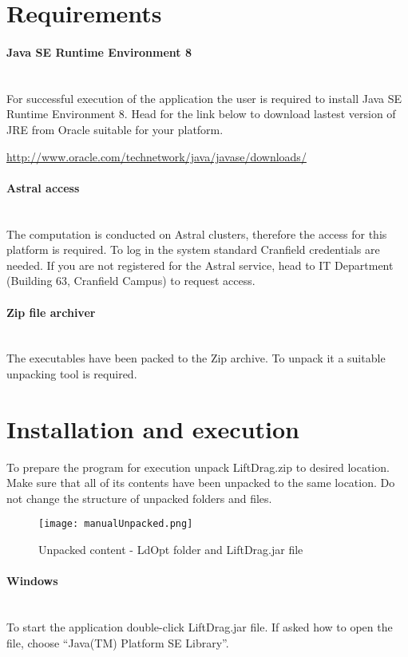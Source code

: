 \documentclass[a4paper,12pt]{article}
\begin{document}
\section{Requirements}
\paragraph{Java SE Runtime Environment 8}\mbox{}\\
For successful execution of the application the user is required to install Java SE Runtime Environment 8. Head for the link below to download lastest version of JRE from Oracle suitable for your platform.
\newline

\url{http://www.oracle.com/technetwork/java/javase/downloads/}

\paragraph{Astral access}\mbox{}\\
The computation is conducted on Astral clusters, therefore the access for this platform is required. To log in the system standard Cranfield credentials are needed. If you are not registered for the Astral service, head to IT Department (Building 63, Cranfield Campus) to request access.

\paragraph{Zip file archiver}\mbox{}\\
The executables have been packed to the Zip archive. To unpack it a suitable unpacking tool is required.

\section{Installation and execution}
To prepare the program for execution unpack LiftDrag.zip to desired location. Make sure that all of its contents have been unpacked to the same location. Do not change the structure of unpacked folders and files.

\begin{figure}[h!]
	\centering
\texttt{[image: manualUnpacked.png]}\\
\caption{Unpacked content - LdOpt folder and LiftDrag.jar file}
\end{figure}

\paragraph{Windows}\mbox{}\\
To start the application double-click LiftDrag.jar file. If asked how to open the file, choose ``Java(TM) Platform SE Library''.
\end{document}
